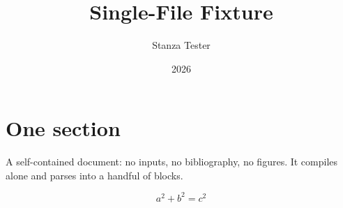 \documentclass[11pt]{article}
\title{Single-File Fixture}
\author{Stanza Tester}
\date{2026}
\begin{document}
\maketitle

\section{One section}

A self-contained document: no inputs, no bibliography, no figures.
It compiles alone and parses into a handful of blocks.

\begin{equation}
  a^2 + b^2 = c^2
\end{equation}
\end{document}
